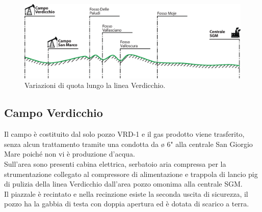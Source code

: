 \begin{figure}[htbp]
	\centering
    \includegraphics[width=\textwidth]{fig/test/linea-vrd-quota.eps}
 	\caption{Variazioni di quota lungo la linea Verdicchio.}
 	\label{fig:quota-linea-vrd}
\end{figure}

\subsection{Campo Verdicchio}
Il campo è costituito dal solo pozzo VRD-1 e il gas prodotto viene trasferito, senza alcun trattamento tramite una condotta da ø 6" alla centrale San Giorgio Mare poiché non vi è produzione d'acqua.\\
Sull'area sono presenti cabina elettrica, serbatoio aria compressa per la strumentazione collegato al compressore di alimentazione e trappola di lancio pig di pulizia della linea Verdicchio dall'area pozzo omonima alla centrale SGM.\\
Il piazzale è recintato e nella recinzione esiste la seconda uscita di sicurezza, il pozzo ha la gabbia di testa con doppia apertura ed è dotata di scarico a terra.

